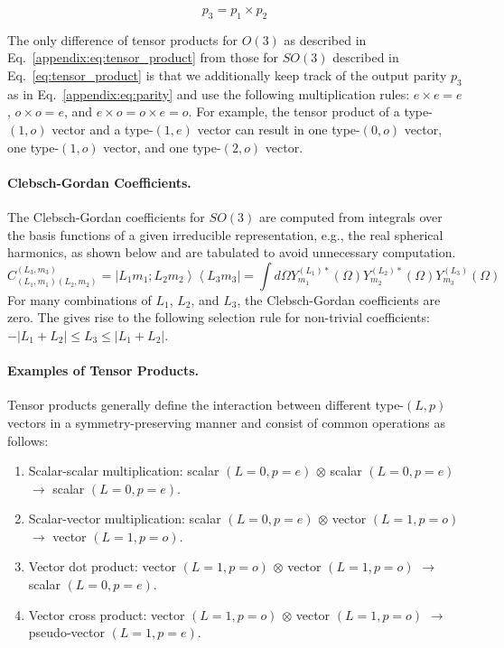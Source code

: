\begin{equation}
p_3 = p_1 \times p_2
\label{appendix:eq:parity}
\end{equation}

The only difference of tensor products for $O(3)$ as described in Eq.~\ref{appendix:eq:tensor_product} from those for $SO(3)$ described in Eq.~\ref{eq:tensor_product} is that we additionally keep track of the output parity $p_3$ as in Eq.~\ref{appendix:eq:parity} and use the following multiplication rules: $e \times e = e$, $o \times o = e$, and $e \times o = o \times e = o$.
For example, the tensor product of a type-$(1, o)$ vector and a type-$(1, e)$ vector can result in one type-$(0, o)$ vector, one type-$(1, o)$ vector, and one type-$(2, o)$ vector.


\paragraph{Clebsch-Gordan Coefficients.}
The Clebsch-Gordan coefficients for $SO(3)$ are computed from integrals over the basis functions of a given irreducible representation, e.g., the real spherical harmonics, as shown below and are tabulated to avoid unnecessary computation.
\begin{equation}
     C_{(L_1, m_1) (L_2, m_2)}^{(L_3, m_3)} = \left|L_1 m_1; L_2 m_2 \right> \left<L_3 m_3 \right| = \int d{\Omega} Y^{(L_1)*}_{m_1}(\Omega) Y^{(L_2)*}_{m_2}(\Omega) Y^{(L_3)}_{m_3}(\Omega)
\end{equation}
For many combinations of $L_1$, $L_2$, and $L_3$, the Clebsch-Gordan coefficients are zero. The gives rise to the following selection rule for non-trivial coefficients: $-|L_1 + L_2| \leq L_3 \leq |L_1 + L_2|$.


\paragraph{Examples of Tensor Products.}
Tensor products generally define the interaction between different type-$(L, p)$ vectors in a symmetry-preserving manner and consist of common operations as follows:
\begin{enumerate}
    \item Scalar-scalar multiplication: scalar $(L=0, p = e)$ $\otimes$ scalar $(L=0, p=e)$ $\rightarrow$ scalar $(L=0, p=e)$.
    \item Scalar-vector multiplication: scalar $(L=0, p = e)$ $\otimes$ vector $(L=1, p=o)$ $\rightarrow$ vector $(L=1, p=o)$.
    \item Vector dot product: vector $(L=1, p = o)$ $\otimes$ vector $(L=1, p=o)$ $\rightarrow$ scalar $(L=0, p=e)$.
    \item Vector cross product: vector $(L=1, p = o)$ $\otimes$ vector $(L=1, p=o)$ $\rightarrow$ pseudo-vector $(L=1, p=e)$.
\end{enumerate}

